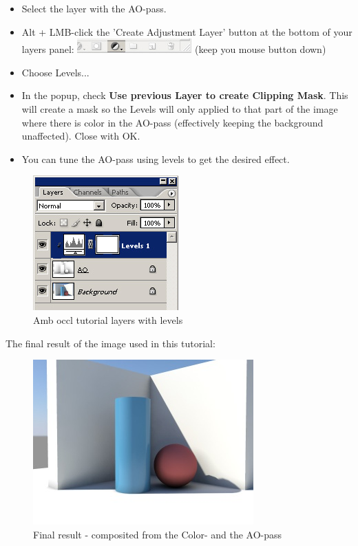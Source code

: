\documentclass[10pt,a4paper]{article}
\begin{document}
\begin{itemize}
	\item Select the layer with the AO-pass.
	\item Alt + LMB-click the 'Create Adjustment Layer' button at the bottom of your layers panel: \includegraphics[width=0.5\linewidth]{figure/Photoshop_add_adjustment_layer} (keep you mouse button down)
	\item Choose Levels...
	\item In the popup, check \textbf{Use previous Layer to create Clipping Mask}. This will create a mask so the Levels will only applied to that part of the image where there is color in the AO-pass (effectively keeping the background unaffected). Close with OK.
	\item You can tune the AO-pass using levels to get the desired effect.
\end{itemize}

\begin{figure}[tbh]
\centering
\includegraphics[width=0.5\linewidth]{figure/Amb_occl_tutorial_layers_with_levels}
\caption{Amb occl tutorial layers with levels}
\label{fig:amboccltutoriallayerswithlevels}
\end{figure}

The final result of the image used in this tutorial:

\begin{figure}[tbh]
\centering
\includegraphics[width=0.5\linewidth]{figure/Amb_occl_tutorial_result}
\caption{Final result - composited from the Color- and the AO-pass}
\label{fig:amboccltutorialresult}
\end{figure}
\end{document}
